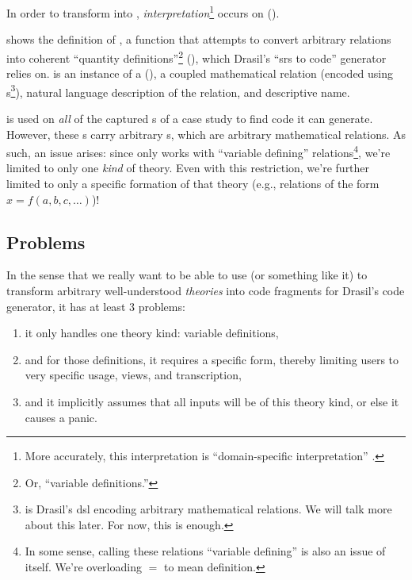 In order to transform  into
, \textit{interpretation}\footnote{More
    accurately, this interpretation is ``domain-specific interpretation''
    \cite{Czarnecki2005}.} occurs on 
().

\originalRelToQDHaskell{}

 shows the definition of \relToQD{}, a function that
attempts to convert arbitrary relations into coherent ``quantity
definitions''\footnote{Or, ``variable definitions.''} (\QDefinition{}), which
Drasil's ``\acs{srs} to code'' generator relies on.  is an
instance of a \RelationConcept{} (), a coupled
mathematical relation (encoded using \Relation{}s\footnote{\Relation{} is
    Drasil's \acs{dsl} encoding arbitrary mathematical relations. We will talk more
    about this later. For now, this is enough.}), natural language description of
the relation, and descriptive name.

\originalRelationConcept{}

\relToQD{} is used on \textit{all} of the captured \InstanceModel{}s of a case
study to find code it can generate. However, these \InstanceModel{}s carry
arbitrary \Relation{}s, which are arbitrary mathematical relations. As such, an
issue arises: since \relToQD{} only works with ``variable defining''
relations\footnote{In some sense, calling these relations ``variable defining''
    is also an issue of itself. We're overloading \(=\) to mean definition.}, we're
limited to only one \textit{kind} of theory. Even with this restriction, we're
further limited to only a specific formation of that theory (e.g., relations of
the form \(x = f(a, b, c, \ldots{})\))!

\subsection{Problems}
\label{chap:modelkinds:sec:transforming-theories-to-code:subsec:problems}

In the sense that we really want to be able to use \relToQD{} (or something like
it) to transform arbitrary well-understood \textit{theories} into code fragments
for Drasil's code generator, it has at least 3 problems:
\begin{enumerate}
    \item[\namedlabel{mk:issue:1}{P1}] it only handles one theory kind:
        variable definitions,
    \item[\namedlabel{mk:issue:2}{P2}] and for those definitions, it requires a
        specific form, thereby limiting users to very specific usage, views, and
        transcription,
    \item[\namedlabel{mk:issue:3}{P3}] and it implicitly assumes that all inputs
        will be of this theory kind, or else it causes a panic.
\end{enumerate}

